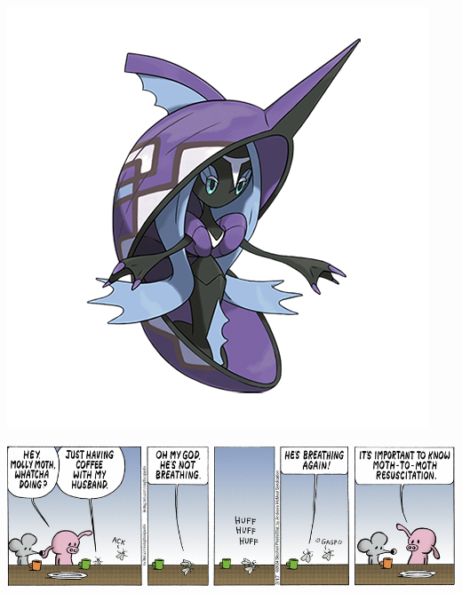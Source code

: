 \documentclass[landscape]{article}
\begin{document}
\begin{multicols}{3}
\vspace{-0.4cm}

\noindent\begin{minipage}{0.3\linewidth}
\noindent\includegraphics[width=\linewidth]{images/pokedex.png}
\end{minipage}
\begin{minipage}{0.74\linewidth}

\end{minipage}

\center\includegraphics[width=\linewidth]{images/comic-pearls.png}


\end{multicols}
\end{document}
